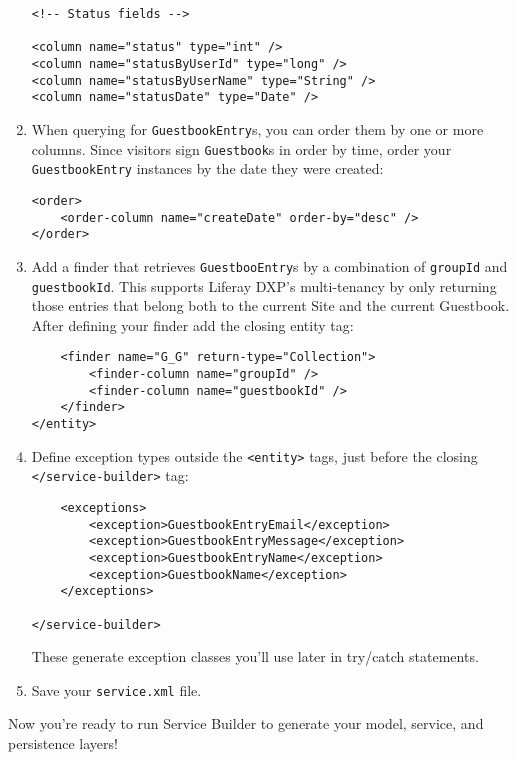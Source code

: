 \begin{enumerate}
\begin{verbatim}
<!-- Status fields -->

<column name="status" type="int" />
<column name="statusByUserId" type="long" />
<column name="statusByUserName" type="String" />
<column name="statusDate" type="Date" />
\end{verbatim}
\item
  When querying for \texttt{GuestbookEntry}s, you can order them by one
  or more columns. Since visitors sign \texttt{Guestbook}s in order by
  time, order your \texttt{GuestbookEntry} instances by the date they
  were created:

\begin{verbatim}
<order>
    <order-column name="createDate" order-by="desc" />
</order>
\end{verbatim}
\item
  Add a finder that retrieves \texttt{GuestbooEntry}s by a combination
  of \texttt{groupId} and \texttt{guestbookId}. This supports Liferay
  DXP's multi-tenancy by only returning those entries that belong both
  to the current Site and the current Guestbook. After defining your
  finder add the closing entity tag:

\begin{verbatim}
    <finder name="G_G" return-type="Collection">
        <finder-column name="groupId" />
        <finder-column name="guestbookId" />
    </finder>
</entity>
\end{verbatim}
\item
  Define exception types outside the
  \texttt{\textless{}entity\textgreater{}} tags, just before the closing
  \texttt{\textless{}/service-builder\textgreater{}} tag:

\begin{verbatim}
    <exceptions>
        <exception>GuestbookEntryEmail</exception>
        <exception>GuestbookEntryMessage</exception>
        <exception>GuestbookEntryName</exception>
        <exception>GuestbookName</exception>
    </exceptions>

</service-builder>
\end{verbatim}

  These generate exception classes you'll use later in try/catch
  statements.
\item
  Save your \texttt{service.xml} file.
\end{enumerate}

Now you're ready to run Service Builder to generate your model, service,
and persistence layers!

